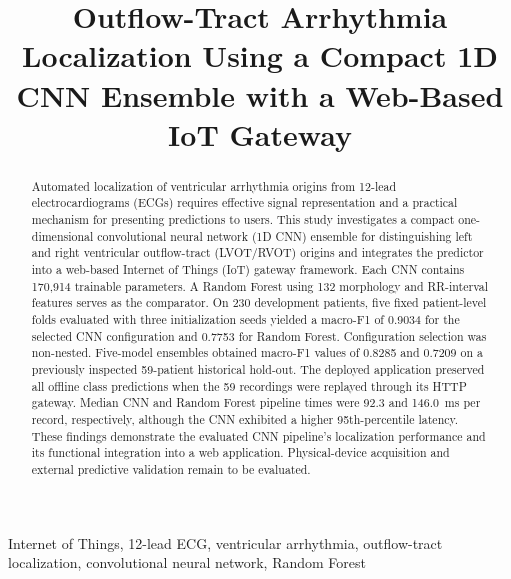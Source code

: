 \documentclass[conference,a4paper]{IEEEtran}
\begin{document}
\title{Outflow-Tract Arrhythmia Localization Using a Compact 1D CNN Ensemble with a Web-Based IoT Gateway}
\author{
\and
{}
}
\maketitle

\begin{abstract}
Automated localization of ventricular arrhythmia origins from 12-lead electrocardiograms (ECGs) requires effective signal representation and a practical mechanism for presenting predictions to users. This study investigates a compact one-dimensional convolutional neural network (1D CNN) ensemble for distinguishing left and right ventricular outflow-tract (LVOT/RVOT) origins and integrates the predictor into a web-based Internet of Things (IoT) gateway framework. Each CNN contains 170,914 trainable parameters. A Random Forest using 132 morphology and RR-interval features serves as the comparator. On 230 development patients, five fixed patient-level folds evaluated with three initialization seeds yielded a macro-F1 of 0.9034 for the selected CNN configuration and 0.7753 for Random Forest. Configuration selection was non-nested. Five-model ensembles obtained macro-F1 values of 0.8285 and 0.7209 on a previously inspected 59-patient historical hold-out. The deployed application preserved all offline class predictions when the 59 recordings were replayed through its HTTP gateway. Median CNN and Random Forest pipeline times were 92.3 and 146.0~ms per record, respectively, although the CNN exhibited a higher 95th-percentile latency. These findings demonstrate the evaluated CNN pipeline's localization performance and its functional integration into a web application. Physical-device acquisition and external predictive validation remain to be evaluated.
\end{abstract}
\begin{IEEEkeywords}
Internet of Things, 12-lead ECG, ventricular arrhythmia, outflow-tract localization, convolutional neural network, Random Forest
\end{IEEEkeywords}
\end{document}
